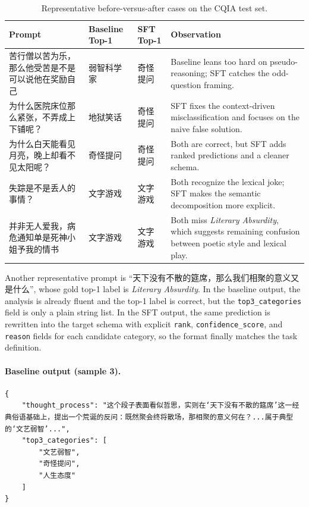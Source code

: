 \documentclass{article}
\begin{document}
\begin{table}[H]
\centering
\small
\caption{Representative before-versus-after cases on the CQIA test set.}
\label{tab:qualitative_cases}
\begin{tabularx}{\textwidth}{>{\raggedright\arraybackslash}p{} >{\raggedright\arraybackslash}p{} >{\raggedright\arraybackslash}p{} X}
\toprule
Prompt & Baseline Top-1 & SFT Top-1 & Observation \\
\midrule
苦行僧以苦为乐，那么他受苦是不是可以说他在奖励自己 & 弱智科学家 & 奇怪提问 & Baseline leans too hard on pseudo-reasoning; SFT catches the odd-question framing. \\
为什么医院床位那么紧张，不弄成上下铺呢？ & 地狱笑话 & 奇怪提问 & SFT fixes the context-driven misclassification and focuses on the naive false solution. \\
为什么白天能看见月亮，晚上却看不见太阳呢？ & 奇怪提问 & 奇怪提问 & Both are correct, but SFT adds ranked predictions and a cleaner schema. \\
失踪是不是丢人的事情？ & 文字游戏 & 文字游戏 & Both recognize the lexical joke; SFT makes the semantic decomposition more explicit. \\
并非无人爱我，病危通知单是死神小姐予我的情书 & 文字游戏 & 文字游戏 & Both miss \textit{Literary Absurdity}, which suggests remaining confusion between poetic style and lexical play. \\
\bottomrule
\end{tabularx}
\end{table}

Another representative prompt is ``天下没有不散的筵席，那么我们相聚的意义又是什么'', whose gold top-1 label is \textit{Literary Absurdity}. In the baseline output, the analysis is already fluent and the top-1 label is correct, but the \texttt{top3\_categories} field is only a plain string list. In the SFT output, the same prediction is rewritten into the target schema with explicit \texttt{rank}, \texttt{confidence\_score}, and \texttt{reason} fields for each candidate category, so the format finally matches the task definition.

\paragraph{Baseline output (sample 3).}
\begin{lstlisting}[style=promptstyle]
{
    "thought_process": "这个段子表面看似哲思，实则在‘天下没有不散的筵席’这一经典俗语基础上，提出一个荒诞的反问：既然聚会终将散场，那相聚的意义何在？...属于典型的‘文艺弱智’...",
    "top3_categories": [
        "文艺弱智",
        "奇怪提问",
        "人生态度"
    ]
}
\end{lstlisting}
\end{document}
